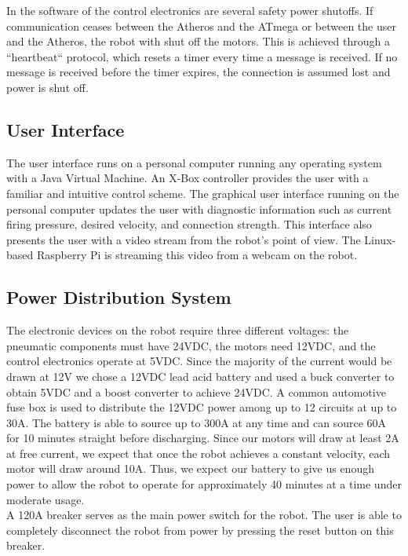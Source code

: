 \documentclass[letterpaper,12pt]{article}
\begin{document}
In the software of the control electronics are several safety power shutoffs.
If communication ceases between the Atheros and the ATmega or between the user
and the Atheros, the robot with shut off the motors. This is achieved through
a “heartbeat“ protocol, which resets a timer every time a message is received.
If no message is received before the timer expires, the connection is assumed
lost and power is shut off.\\

\subsection{User Interface}
The user interface runs on a personal computer running any operating system
with a Java Virtual Machine. An X-Box controller provides the user with
a familiar and intuitive control scheme. The graphical user interface running
on the personal computer updates the user with diagnostic information such as
current firing pressure, desired velocity, and connection strength. This
interface also presents the user with a video stream from the robot’s point of
view. The Linux-based Raspberry Pi is streaming this
video from a webcam on the robot.\\

\subsection{Power Distribution System}
The electronic devices on the robot require three different voltages: the
pneumatic components must have 24VDC, the motors need 12VDC, and the control
electronics operate at 5VDC. Since the majority of the current would be drawn
at 12V we chose a 12VDC lead acid battery and used a buck converter to obtain
5VDC and a boost converter to achieve 24VDC. A common automotive fuse box is
used to distribute the 12VDC power among up to 12 circuits at up to 30A. The
battery is able to source up to 300A at any time and can source 60A for 10
minutes straight before discharging. Since our motors will draw at least 2A at
free current, we expect that once the robot achieves a constant velocity, each
motor will draw around 10A. Thus, we expect our battery to give us enough power
to allow the robot to operate for approximately 40 minutes at a time under
moderate usage.\\

A 120A breaker serves as the main power switch for the robot. The user is able
to completely disconnect the robot from power by pressing the reset button on
this breaker.
\end{document}
